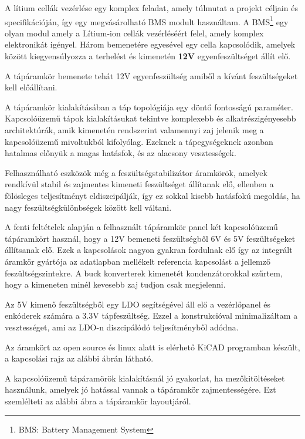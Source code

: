 \medskip

A lítium cellák vezérlése egy komplex feladat, amely túlmutat a projekt céljain
és specifikációján, így egy megvásárolható BMS modult használtam. A
BMS\footnote{BMS: Battery Management System} egy olyan modul amely a Lítium-ion
cellák vezérléséért felel, amely komplex elektronikát igényel. Három bemenetére
egyesével egy cella kapcsolódik, amelyek között kiegyensúlyozza a terhelést és
kimenetén \textbf{12V} egyenfeszültséget állít elő.

A tápáramkör bemenete tehát 12V egyenfeszültség amiből a kívánt feszültségeket
kell előállítani. 


A tápáramkör kialakításában a táp topológiája egy döntő fontosságú paraméter.
Kapcsolóüzemű tápok kialakításukat tekintve komplexebb és alkatrészigényesebb
architektúrák, amik kimenetén rendszerint valamennyi zaj jelenik meg a
kapcsolóüzemű mivoltukból kifolyólag. Ezeknek a tápegységeknek azonban hatalmas
előnyük a magas hatásfok, és az alacsony vesztességek.

Felhasználható eszközök még a feszültségstabilizátor áramkörök, amelyek rendkívül
stabil és zajmentes kimeneti feszültséget állítanak elő, ellenben a fölösleges
teljesítményt eldiszcipálják, így ez sokkal kisebb hatásfokú megoldás, ha nagy
feszültségkülönbségek között kell váltani.

A fenti feltételek alapján a felhasznált tápáramkör panel két kapcsolóüzemű
tápáramkört használ, hogy a 12V bemeneti feszültségből 6V és 5V feszültségeket
állítsanak elő. Ezek a kapcsolások nagyon gyakran fordulnak elő így az integrált
áramkör gyártója az adatlapban mellékelt referencia kapcsolást a jellemző
feszültségszintekre. A buck konverterek kimenetét kondenzátorokkal szűrtem, hogy
a kimeneten minél kevesebb zaj tudjon csak megjelenni.

Az 5V kimenő feszültségből egy LDO segítségével áll elő a vezérlőpanel és
enkóderek számára a 3.3V tápfeszültség. Ezzel a konstrukcióval minimalizáltam
a vesztességet, ami az LDO-n diszcipálódó teljesítményből adódna. 

Az áramkört az open source és linux alatt is elérhető KiCAD programban
készült, a kapcsolási rajz az alábbi ábrán látható.


A kapcsolóüzemű tápáramörök kialakításnál jó gyakorlat, ha mezőkitöltéseket
használunk, amelyek jó hatással vannak a tápáramkör zajmentességére. Ezt
szemlélteti az alábbi ábra a tápáramkör layoutjáról.

